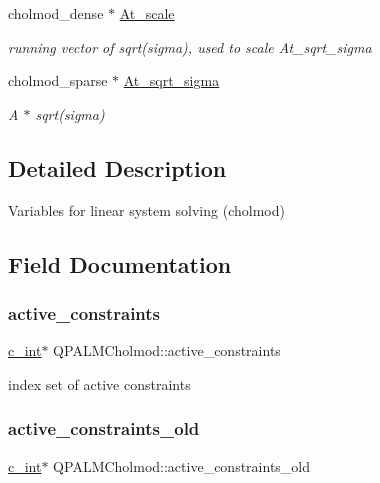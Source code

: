 \begin{DoxyCompactItemize}
cholmod\+\_\+dense $\ast$ \mbox{\hyperlink{structQPALMCholmod_a21442e539bbff4c9a2cba6f94f067b96}{At\+\_\+scale}}
\begin{DoxyCompactList}\small\item\em running vector of sqrt(sigma), used to scale At\+\_\+sqrt\+\_\+sigma \end{DoxyCompactList}\item 
cholmod\+\_\+sparse $\ast$ \mbox{\hyperlink{structQPALMCholmod_a26018b83bc91c059f03950f66862320c}{At\+\_\+sqrt\+\_\+sigma}}
\begin{DoxyCompactList}\small\item\em A\textquotesingle{} $\ast$ sqrt(sigma) \end{DoxyCompactList}\end{DoxyCompactItemize}


\subsection{Detailed Description}
Variables for linear system solving (cholmod) 

\subsection{Field Documentation}
\mbox{\label{structQPALMCholmod_a90e849ad034aa9c44fdb05b4a28f4d94}} 
\subsubsection{\texorpdfstring{active\_constraints}{active\_constraints}}
{\footnotesize\ttfamily \mbox{\hyperlink{global__opts_8h_aa3217a0f49d3e52b74e9dd830c44472f}{c\+\_\+int}}$\ast$ Q\+P\+A\+L\+M\+Cholmod\+::active\+\_\+constraints}



index set of active constraints 

\mbox{\label{structQPALMCholmod_a9689c1013d1d38928c62c07d76fea9d3}} 
\subsubsection{\texorpdfstring{active\_constraints\_old}{active\_constraints\_old}}
{\footnotesize\ttfamily \mbox{\hyperlink{global__opts_8h_aa3217a0f49d3e52b74e9dd830c44472f}{c\+\_\+int}}$\ast$ Q\+P\+A\+L\+M\+Cholmod\+::active\+\_\+constraints\+\_\+old}



